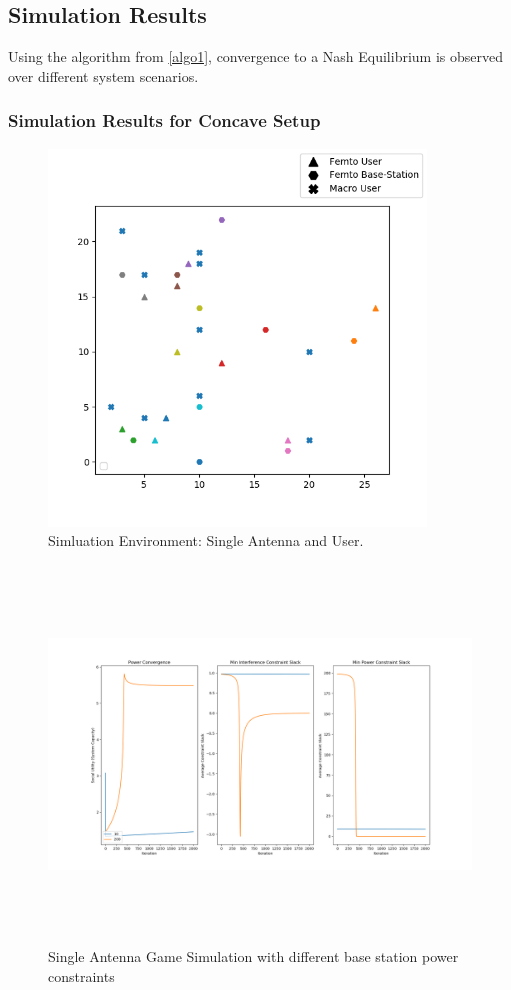 \documentclass[12pt,a4paper]{report}
\begin{document}
\subsection{Simulation Results}
Using the algorithm from \ref{algo1}, convergence to a Nash Equilibrium is observed over different system scenarios. 
\subsubsection{Simulation Results for Concave Setup}

\begin{figure}[H]
	\includegraphics[width=\textwidth,height = 10cm]{figures/system_figure_single}
	  \caption{Simluation Environment: Single Antenna and User.}
\end{figure}

\begin{figure}[H]
	\includegraphics[width= 15cm,height = 10cm]{figures/single_power}
	  \caption{Single Antenna Game Simulation with different base station power constraints}
\end{figure}
\end{document}
